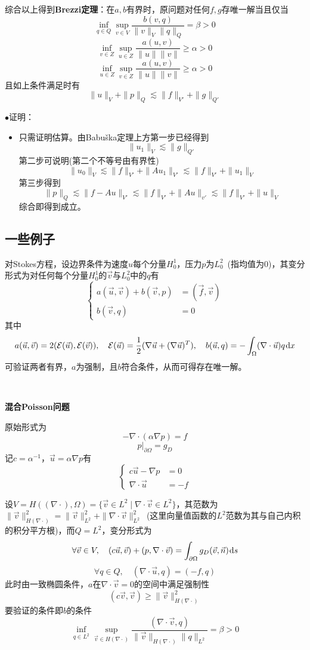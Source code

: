\documentclass[a4paper,UTF8,fontset=windows]{ctexart}
\newcommand*{\dr}{\hspace{0.07em}\mathrm{d}}
\newcommand{\proo}[1]{{\kaishu $\bullet$证明：
\begin{itemize}
    \item[] #1
\end{itemize}
}}
\begin{document}
综合以上得到\textbf{Brezzi定理}：在$a,b$有界时，原问题对任何$f,g$存唯一解当且仅当
$$\inf_{q\in Q}\sup_{v\in V}\frac{b(v,q)}{\|v\|_V\|q\|_Q}=\beta>0$$
$$\inf_{v\in Z}\sup_{u\in Z}\frac{a(u,v)}{\|u\|\|v\|}\ge\alpha>0$$
$$\inf_{u\in Z}\sup_{v\in Z}\frac{a(u,v)}{\|u\|\|v\|}\ge\alpha>0$$
且如上条件满足时有
$$\|u\|_V+\|p\|_Q\lesssim\|f\|_{V'}+\|g\|_{Q'}$$
\proo{
    只需证明估算。由Babu\v ska定理上方第一步已经得到
    $$\|u_1\|_V\lesssim\|g\|_{Q'}$$
    第二步可说明(第二个不等号由有界性)
    $$\|u_0\|_V\lesssim\|f\|_{V'}+\|Au_1\|_{V'}\lesssim\|f\|_{V'}+\|u_1\|_V$$
    第三步得到
    $$\|p\|_Q\lesssim\|f-Au\|_{V'}\lesssim\|f\|_{V'}+\|Au\|_{v'}\lesssim\|f\|_{V'}+\|u\|_V$$
    综合即得到成立。
}

\subsection{一些例子}

对Stokes方程，设边界条件为速度$u$每个分量$H_0^1$，压力$p$为$L_0^2$\ (指均值为0)，其变分形式为对任何每个分量$H_0^1$的$\vec{v}$与$L_0^2$中的$q$有
$$\begin{cases}a(\vec{u},\vec{v})+b(\vec{v},p)&=(\vec{f},\vec{v})\\b(\vec{v},q)&=0\end{cases}$$
其中
$$a(\vec{u},\vec{v})=2(\mathcal{E}(\vec{u}),\mathcal{E}(\vec{v})),\quad\mathcal{E}(\vec{u})=\frac{1}{2}(\nabla\vec{u}+(\nabla\vec{u})^T),\quad b(\vec{u},q)=-\int_\Omega(\nabla\cdot\vec{u})q\dr x$$
可验证两者有界，$a$为强制，且$b$符合条件，从而可得存在唯一解。

\

\textbf{混合Poisson问题}

原始形式为
$$-\nabla\cdot(\alpha\nabla p)=f$$
$$p\big|_{\partial\Omega}=g_D$$
记$c=\alpha^{-1}$，$\vec{u}=\alpha\nabla p$有
$$\begin{cases}c\vec{u}-\nabla p&=0\\\nabla\cdot\vec{u}&=-f\end{cases}$$

设$V=H((\nabla\cdot),\Omega)=\{\vec{v}\in L^2\mid\nabla\cdot\vec{v}\in L^2\}$，其范数为$\|\vec{v}\|_{H(\nabla\cdot)}^2=\|\vec{v}\|_{L^2}^2+\|\nabla\cdot\vec{v}\|_{L^2}^2$\ (这里向量值函数的$L^2$范数为其与自己内积的积分平方根)，而$Q=L^2$，变分形式为
$$\forall\vec{v}\in V,\quad(c\vec{u},\vec{v})+(p,\nabla\cdot\vec{v})=\int_{\partial\Omega}g_D(\vec{v},\vec{n})\dr s$$
$$\forall q\in Q,\quad (\nabla\cdot\vec{u},q)=(-f,q)$$
此时由一致椭圆条件，$a$在$\nabla\cdot\vec{v}=0$的空间中满足强制性
$$(c\vec{v},\vec{v})\ge\|\vec{v}\|_{H(\nabla\cdot)}^2$$
要验证的条件即$b$的条件
$$\inf_{q\in L^2}\sup_{\vec{v}\in H(\nabla\cdot)}\frac{(\nabla\cdot\vec{v},q)}{\|\vec{v}\|_{H(\nabla\cdot)}\|q\|_{L^2}}=\beta>0$$
\end{document}
